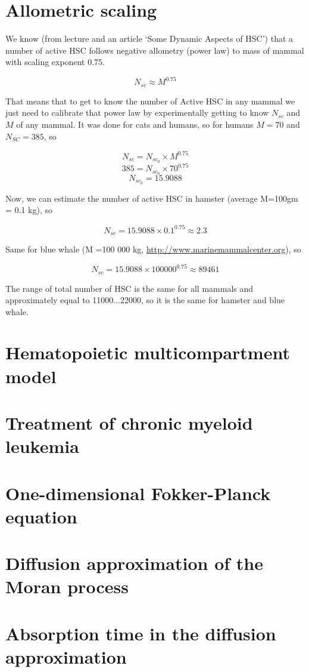 \newcommand{\package}{\emph}

\setcounter{chapter}{1}
\setcounter{section}{0}
\section{Allometric scaling}
We know (from lecture and an article ‘Some Dynamic Aspects of HSC’) that a number of active HSC follows negative allometry (power law) to mass of mammal with scaling exponent $0.75$. 

\[ N_{sc} \approx M^{0.75} \]

That means that to get to know the number of Active HSC in any mammal we just need to calibrate that power law by experimentally getting to know $N_{sc}$ and $M$ of any mammal. It was done for cats and humans, so for humans $M=70$ and $N_{SC}=385$, so

\[ N_{sc}= N_{sc_0}\times M^{0.75} \]
\[ 385=N_{sc_0}\times 70^{0.75} \]
\[N_{sc_0}=15.9088\]

Now, we can estimate the number of active HSC in hamster (average M=100gm = 0.1 kg), so

\[ N_{sc}= 15.9088 \times 0.1^{0.75} \approx 2.3 \]

Same for blue whale (M =100 000 kg, \url{http://www.marinemammalcenter.org}), so

\[ N_{sc}= 15.9088 \times 100000^{0.75} \approx 89 461 \]

The range of total number of HSC is the same for all mammals and approximately equal to 11000...22000, so it is the same for hamster and blue whale.

\setcounter{chapter}{2}
\setcounter{section}{0}
\section{Hematopoietic multicompartment model}

\setcounter{chapter}{3}
\setcounter{section}{0}
\section{Treatment of chronic myeloid leukemia}

\setcounter{chapter}{4}
\setcounter{section}{0}
\section{One-dimensional Fokker-Planck equation}

\setcounter{chapter}{5}
\setcounter{section}{0}
\section{Diffusion approximation of the Moran process}

\setcounter{chapter}{6}
\setcounter{section}{0}
\section{Absorption time in the diffusion approximation}
